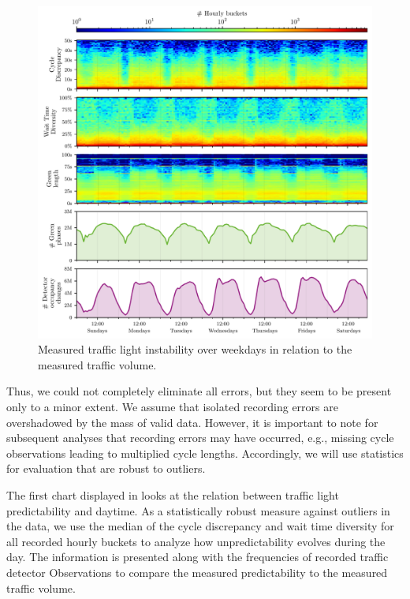 \begin{figure}[!t]
    \centering
    \includegraphics[width=\linewidth]{images/predictability-week-heatmap.pdf}
    \caption{Measured traffic light instability over weekdays in relation to the measured traffic volume.}\label{fig:adaptiveness-weekdays-distance}
\end{figure}

Thus, we could not completely eliminate all errors, but they seem to be present only to a minor extent. We assume that isolated recording errors are overshadowed by the mass of valid data. However, it is important to note for subsequent analyses that recording errors may have occurred, e.g., missing cycle observations leading to multiplied cycle lengths. Accordingly, we will use statistics for evaluation that are robust to outliers.

The first chart displayed in  looks at the relation between traffic light predictability and daytime. As a statistically robust measure against outliers in the data, we use the median of the cycle discrepancy and wait time diversity for all recorded hourly buckets to analyze how unpredictability evolves during the day. The information is presented along with the frequencies of recorded traffic detector Observations to compare the measured predictability to the measured traffic volume.

